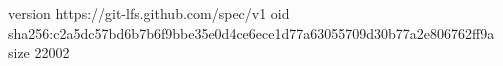 version https://git-lfs.github.com/spec/v1
oid sha256:c2a5dc57bd6b7b6f9bbe35e0d4ce6ece1d77a63055709d30b77a2e806762ff9a
size 22002
